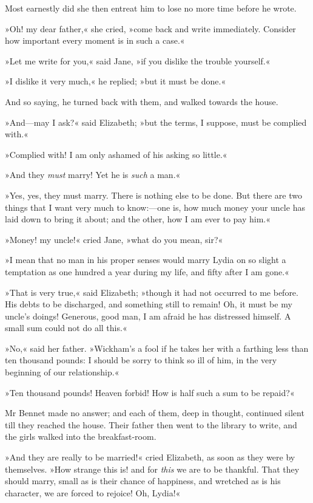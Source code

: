 Most earnestly did she then entreat him to lose no more time before he wrote.

»Oh! my dear father,« she cried, »come back and write immediately. Consider how important every moment is in such a case.«

»Let me write for you,« said Jane, »if you dislike the trouble yourself.«

»I dislike it very much,« he replied; »but it must be done.«

And so saying, he turned back with them, and walked towards the house.

»And—may I ask?« said Elizabeth; »but the terms, I suppose, must be complied with.«

»Complied with! I am only ashamed of his asking so little.«

»And they \textit{must} marry! Yet he is \textit{such} a man.«

»Yes, yes, they must marry. There is nothing else to be done. But there are two things that I want very much to know:—one is, how much money your uncle has laid down to bring it about; and the other, how I am ever to pay him.«

»Money! my uncle!« cried Jane, »what do you mean, sir?«

»I mean that no man in his proper senses would marry Lydia on so slight a temptation as one hundred a year during my life, and fifty after I am gone.«

»That is very true,« said Elizabeth; »though it had not occurred to me before. His debts to be discharged, and something still to remain! Oh, it must be my uncle's doings! Generous, good man, I am afraid he has distressed himself. A small sum could not do all this.«

»No,« said her father. »Wickham's a fool if he takes her with a farthing less than ten thousand pounds: I should be sorry to think so ill of him, in the very beginning of our relationship.«

»Ten thousand pounds! Heaven forbid! How is half such a sum to be repaid?«

Mr Bennet made no answer; and each of them, deep in thought, continued silent till they reached the house. Their father then went to the library to write, and the girls walked into the breakfast-room.

»And they are really to be married!« cried Elizabeth, as soon as they were by themselves. »How strange this is! and for \textit{this} we are to be thankful. That they should marry, small as is their chance of happiness, and wretched as is his character, we are forced to rejoice! Oh, Lydia!«


